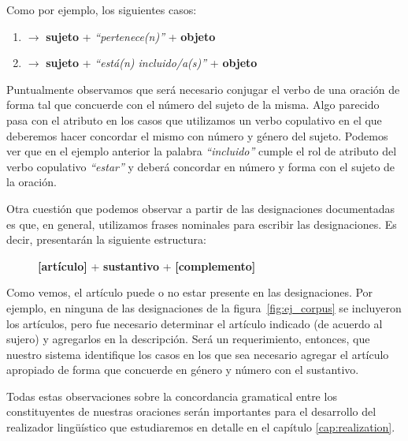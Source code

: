 \noindent
Como por ejemplo, los siguientes casos:

\bigskip
\begin{enumerate}
 \item {} $\rightarrow$ \textbf{sujeto} + \emph{``pertenece(n)''} + \textbf{objeto}
 \item {} $\rightarrow$ \textbf{sujeto} + \emph{``está(n) incluido/a(s)''} + \textbf{objeto}
\end{enumerate}

\bigskip
Puntualmente observamos que será necesario conjugar el verbo de una oración de forma tal que concuerde con el número del sujeto de la misma. Algo parecido pasa con el atributo en los casos que utilizamos un verbo copulativo en el que deberemos hacer concordar el mismo con número y género del sujeto. Podemos ver que en el ejemplo anterior la palabra \emph{``incluido''} cumple el rol de atributo del verbo copulativo \emph{``estar''} y deberá concordar en número y forma con el sujeto de la oración. 


Otra cuestión que podemos observar a partir de las designaciones documentadas es que, en general, utilizamos frases nominales para escribir las designaciones. Es decir, presentarán la siguiente estructura:

\begin{figure}[H]
\center
\textbf{[artículo]} + \textbf{sustantivo} + \textbf{[complemento]}
\end{figure}

Como vemos, el artículo puede o no estar presente en las designaciones. Por ejemplo, en ninguna de las designaciones de la figura~\ref{fig:ej_corpus} se incluyeron los artículos, pero fue necesario determinar el artículo indicado (de acuerdo al sujero) y agregarlos en la descripción. Será un requerimiento, entonces, que nuestro sistema identifique los casos en los que sea necesario agregar el artículo apropiado de forma que concuerde en género y número con el sustantivo. 

Todas estas observaciones sobre la concordancia gramatical entre los constituyentes de nuestras oraciones serán importantes para el desarrollo del realizador lingüístico que estudiaremos en detalle en el capítulo \ref{cap:realization}.

